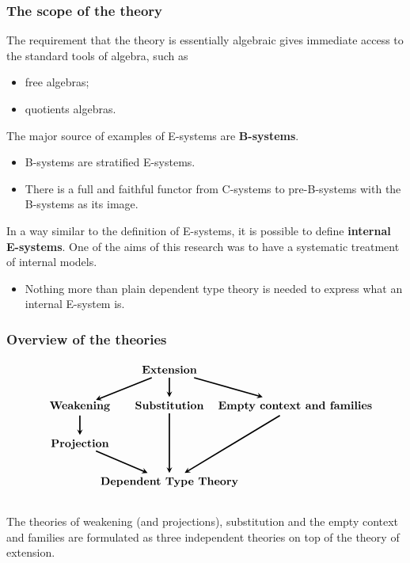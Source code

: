 \documentclass{beamer}
\newcommand\important[1]{\textbf{\color{red!90!black}#1}}
\begin{document}
\begin{frame}
\frametitle{\bf The scope of the theory}
The requirement that the theory is essentially algebraic gives immediate access to the standard tools of algebra, such as
\begin{itemize}
\item free algebras;
\item quotients algebras.
\end{itemize}
\pause
The major source of examples of E-systems are \important{B-systems}.
\begin{itemize}
\item B-systems are stratified E-systems.
\item There is a full and faithful functor from C-systems to pre-B-systems with the B-systems as its image.
\end{itemize}
\pause
In a way similar to the definition of E-systems, it is possible to define
\important{internal E-systems}. One of the aims of this research was to have
a systematic treatment of internal models.
\begin{itemize}
\item Nothing more than plain dependent type theory is needed to express what
an internal E-system is.
\end{itemize}
\end{frame}

\begin{frame}
\frametitle{\bf Overview of the theories}
\begin{equation*}
\begin{tikzcd}[ampersand replacement=\&,column sep=0em]
{} \& \textbf{Extension} \ar[very thick,-stealth]{dr} \ar[very thick,-stealth]{d} \ar[very thick,-stealth]{dl}
  \\
\makebox[.7cm]{\textbf{Weakening}} \ar[very thick,-stealth]{d} \& \textbf{Substitution} \ar[very thick,-stealth]{dd} \& \makebox[3cm]{\textbf{Empty context and families}} \ar[very thick,-stealth]{ddl}
\\
\makebox[.7cm]{\textbf{Projection}} \ar[very thick,-stealth]{dr}
\\
{} \& \textbf{Dependent Type Theory}
\end{tikzcd}
\end{equation*}
\\[2em]
\pause
The theories of weakening (and projections), substitution and the empty context and families are formulated as three independent theories on top of the theory of extension.
\end{frame}
\end{document}
